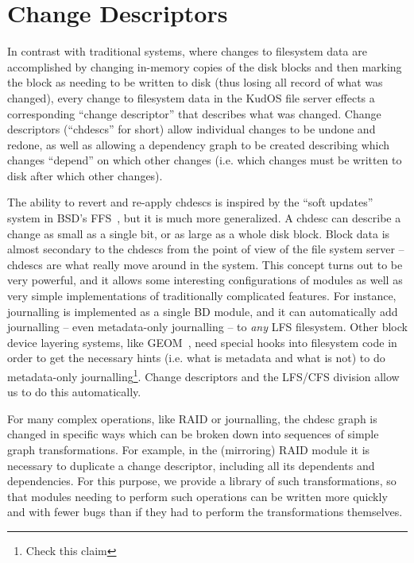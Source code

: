 \section{Change Descriptors}
\label{sec:chdescs}

In contrast with traditional systems, where changes to filesystem data are
accomplished by changing in-memory copies of the disk blocks and then marking
the block as needing to be written to disk (thus losing all record of what was
changed), every change to filesystem data in the KudOS file server effects a
corresponding ``change descriptor'' that describes what was changed. Change
descriptors (``chdescs'' for short) allow individual changes to be undone and
redone, as well as allowing a dependency graph to be created describing which
changes ``depend'' on which other changes (i.e. which changes must be written to
disk after which other changes).

The ability to revert and re-apply chdescs is inspired by the ``soft updates''
system in BSD's FFS~\cite{ganger00soft}, but it is much more generalized. A
chdesc can describe a change as small as a single bit, or as large as a whole
disk block. Block data is almost secondary to the chdescs from the point of view
of the file system server -- chdescs are what really move around in the system.
This concept turns out to be very powerful, and it allows some interesting
configurations of modules as well as very simple implementations of
traditionally complicated features. For instance, journalling is implemented as
a single BD module, and it can automatically add journalling -- even
metadata-only journalling -- to {\it any} LFS filesystem. Other block device
layering systems, like GEOM~\cite{geom}, need special hooks into filesystem code
in order to get the necessary hints (i.e. what is metadata and what is not) to
do metadata-only journalling\footnote{Check this claim}. Change descriptors and the LFS/CFS division allow
us to do this automatically.

For many complex operations, like RAID or journalling, the chdesc graph is
changed in specific ways which can be broken down into sequences of simple graph
transformations. For example, in the (mirroring) RAID module it is necessary to
duplicate a change descriptor, including all its dependents and dependencies.
For this purpose, we provide a library of such transformations, so that modules
needing to perform such operations can be written more quickly and with fewer
bugs than if they had to perform the transformations themselves.
